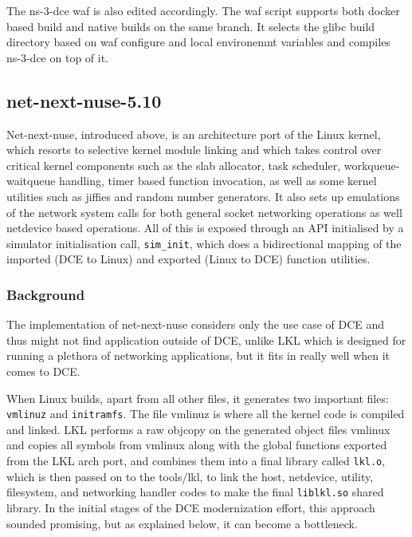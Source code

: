 \documentclass{sig-alternate}
\begin{document}
The ns-3-dce waf is also edited accordingly. The waf script supports both docker based build and native builds on the same branch. It selects the glibc 
build directory based on waf configure and local environemnt variables and compiles ns-3-dce on top of it.

\subsection{net-next-nuse-5.10}
Net-next-nuse, introduced above, is an architecture port of the Linux kernel, which resorts to selective kernel module linking and which takes control over critical kernel 
components such as the slab allocator, task scheduler, workqueue-waitqueue handling, timer based function invocation, as well as some kernel 
utilities such as jiffies and random number generators. It also sets up emulations of the network system calls for both general socket networking 
operations as well netdevice based operations. All of this is exposed through an API initialised by a simulator initialisation call, \texttt{sim\_init}, 
which does a bidirectional mapping of the imported (DCE to Linux) and exported (Linux to DCE) function utilities.

\subsubsection{Background}
The implementation of net-next-nuse considers only the use case of DCE and thus might not find application outside of DCE, unlike LKL which
is designed for running a plethora of networking applications, but it fits in really well when it comes to DCE. 

When Linux builds, apart from all other files, it generates two important files: \texttt{vmlinuz} and \texttt{initramfs}. The file vmlinuz is where all the kernel 
code is compiled and linked. LKL performs a raw objcopy on the generated object 
files vmlinux and copies all symbols from vmlinux along with the global functions exported from the LKL arch port, and combines them into a final 
library called \texttt{lkl.o}, which is then passed on to the tools/lkl, to link the host, netdevice, utility, filesystem, and networking handler codes to 
make the final \texttt{liblkl.so} shared library. In the initial stages of the DCE modernization effort, this approach sounded promising, but as explained below, it can become a bottleneck.
\end{document}
